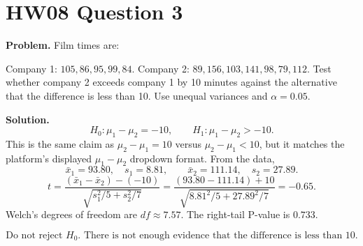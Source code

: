 \documentclass[11pt]{article}
\begin{document}
\section*{HW08 Question 3}

\textbf{Problem.} Film times are:

Company 1: \(105,86,95,99,84\). Company 2: \(89,156,103,141,98,79,112\). Test whether company 2 exceeds company 1 by 10 minutes against the alternative that the difference is less than 10. Use unequal variances and \(\alpha=0.05\).

\textbf{Solution.}
\[
H_0:\mu_1-\mu_2=-10,\qquad H_1:\mu_1-\mu_2>-10.
\]
This is the same claim as \(\mu_2-\mu_1=10\) versus \(\mu_2-\mu_1<10\), but it matches the platform's displayed \(\mu_1-\mu_2\) dropdown format.
From the data,
\[
\bar{x}_1=93.80,\quad s_1=8.81,\qquad \bar{x}_2=111.14,\quad s_2=27.89.
\]
\[
t=\frac{(\bar{x}_1-\bar{x}_2)-(-10)}{\sqrt{s_1^2/5+s_2^2/7}}
=\frac{(93.80-111.14)+10}{\sqrt{8.81^2/5+27.89^2/7}}
=-0.65.
\]
Welch's degrees of freedom are \(df\approx7.57\). The right-tail P-value is \(0.733\).

\[
\boxed{\text{Do not reject }H_0. \text{ There is not enough evidence that the difference is less than 10.}}
\]
\end{document}
